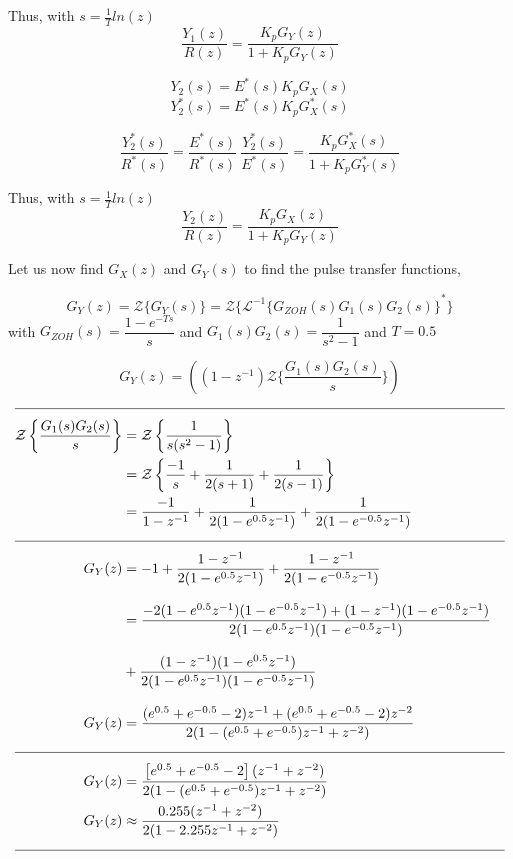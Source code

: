 \documentclass[a4paper,12pt]{article}
\begin{document}
\begin{enumerate}
\begin{enumerate}
		Thus, with $s=\frac{1}{T}ln(z)$
		$$\boxed{ \frac{Y_1(z)}{R(z)} = \frac{K_p G_Y(z)}{1+K_pG_Y(z)} }$$
		
		$$ 	Y_2(s) = E^*(s) K_p G_X(s)  $$
		$$  Y_2^*(s) = E^*(s) K_p G_X^*(s) $$
		
		$$ \frac{Y_2^*(s)}{R^*(s)} = \frac{E^*(s)}{R^*(s)} \ \frac{Y_2^*(s)}{E^*(s)} = \frac{K_p G_X^*(s)}{1+K_pG_Y^*(s)}  $$
		
		Thus, with $s=\frac{1}{T}ln(z)$
		$$\boxed{ \frac{Y_2(z)}{R(z)} = \frac{K_p G_X(z)}{1+K_pG_Y(z)} }$$
		
		
		
		\newpage
		
		Let us now find $G_X(z)$ and $G_Y(s)$ to find the pulse transfer functions,
		
		$$ G_Y(z)=\mathcal{Z}\{G_Y(s)\}  =\mathcal{Z}\{ {\mathcal{L}^{-1}\{G_{ZOH}(s)G_1(s)G_2(s)\}}^*	\}$$
		with $G_{ZOH}(s)=\dfrac{1-e^{-Ts}}{s}$ and $G_1(s)G_2(s)=\dfrac{1}{s^2-1}$ and $\boxed{T=0.5}$
		
			$$\boxed { G_Y(z)=\left((1-z^{-1}) \mathcal{Z}\{ \frac{G_1(s)G_2(s)}{s} \}\right) }$$ 
			\begin{equation*}
				\begin{split}\\[-0.3cm]  \hline \\[-0.3cm] 
		 			\mathcal{Z}\left\{ \frac{G_1(s)G_2(s)}{s} \right\}&=\mathcal{Z}\left\{ \frac{1}{s(s^2-1)} \right\} \\
					&= \mathcal{Z} \left\{ \frac{-1}{s}+\frac{1}{2(s+1)}+\frac{1}{2(s-1)} \right\}\\
					&=\frac{-1}{1-z^{-1}}+ \frac{1}{2(1-e^{0.5}z^{-1})}+ \frac{1}{2(1-e^{-0.5}z^{-1})} \\[0.3cm]  \hline 
					\\[-0.3cm] 
					G_Y(z)&=-1+ \frac{1-z^{-1}}{2(1-e^{0.5}z^{-1})}+ \frac{1-z^{-1}}{2(1-e^{-0.5}z^{-1})} \\[0.3cm]
					&=\frac{-2(1-e^{0.5}z^{-1})(1-e^{-0.5}z^{-1})+(1-z^{-1})(1-e^{-0.5}z^{-1})}{2(1-e^{0.5}z^{-1})(1-e^{-0.5}z^{-1})} \\[0.3cm]
					& +\frac{(1-z^{-1})(1-e^{0.5}z^{-1})}{2(1-e^{0.5}z^{-1})(1-e^{-0.5}z^{-1})} \\[0.3cm]
					G_Y(z)&=\frac{(e^{0.5}+e^{-0.5}-2)z^{-1}+(e^{0.5}+e^{-0.5}-2)z^{-2}}{2(1-(e^{0.5}+e^{-0.5})z^{-1}+z^{-2})} 
					\\[0.3cm]  \hline \\[-0.3cm]
					G_Y(z)&=\frac{\left[e^{0.5}+e^{-0.5}-2\right](z^{-1}+z^{-2})}{2(1-(e^{0.5}+e^{-0.5})z^{-1}+z^{-2})}  \\
					G_Y(z)&\approx \frac{0.255(z^{-1}+z^{-2})}{2(1-2.255z^{-1}+z^{-2})}
					\\[0.3cm]  \hline \\[-0.3cm]
				\end{split} 
			\end{equation*}
			

\end{enumerate}
\end{enumerate}
\end{document}

